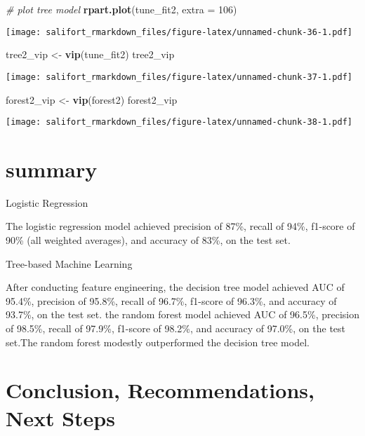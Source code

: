 \documentclass[
]{article}
\newenvironment{Shaded}{\begin{snugshade}}{\end{snugshade}}
\newcommand{\AttributeTok}[1]{\textcolor[rgb]{0.13,0.29,0.53}{#1}}
\newcommand{\CommentTok}[1]{\textcolor[rgb]{0.56,0.35,0.01}{\textit{#1}}}
\newcommand{\DecValTok}[1]{\textcolor[rgb]{0.00,0.00,0.81}{#1}}
\newcommand{\FunctionTok}[1]{\textcolor[rgb]{0.13,0.29,0.53}{\textbf{#1}}}
\newcommand{\NormalTok}[1]{#1}
\newcommand{\OtherTok}[1]{\textcolor[rgb]{0.56,0.35,0.01}{#1}}
\begin{document}
\begin{Shaded}
\begin{Highlighting}[]
\CommentTok{\# plot tree model}
\FunctionTok{rpart.plot}\NormalTok{(tune\_fit2, }\AttributeTok{extra =} \DecValTok{106}\NormalTok{)}
\end{Highlighting}
\end{Shaded}

\texttt{[image: salifort\_rmarkdown\_files/figure-latex/unnamed-chunk-36-1.pdf]}

\begin{Shaded}
\begin{Highlighting}[]
\NormalTok{tree2\_vip }\OtherTok{\textless{}{-}} \FunctionTok{vip}\NormalTok{(tune\_fit2)}
\NormalTok{tree2\_vip}
\end{Highlighting}
\end{Shaded}

\texttt{[image: salifort\_rmarkdown\_files/figure-latex/unnamed-chunk-37-1.pdf]}

\begin{Shaded}
\begin{Highlighting}[]
\NormalTok{forest2\_vip }\OtherTok{\textless{}{-}} \FunctionTok{vip}\NormalTok{(forest2)}
\NormalTok{forest2\_vip}
\end{Highlighting}
\end{Shaded}

\texttt{[image: salifort\_rmarkdown\_files/figure-latex/unnamed-chunk-38-1.pdf]}

\section{summary}\label{summary}

Logistic Regression

The logistic regression model achieved precision of 87\%, recall of
94\%, f1-score of 90\% (all weighted averages), and accuracy of 83\%, on
the test set.

Tree-based Machine Learning

After conducting feature engineering, the decision tree model achieved
AUC of 95.4\%, precision of 95.8\%, recall of 96.7\%, f1-score of
96.3\%, and accuracy of 93.7\%, on the test set. the random forest model
achieved AUC of 96.5\%, precision of 98.5\%, recall of 97.9\%, f1-score
of 98.2\%, and accuracy of 97.0\%, on the test set.The random forest
modestly outperformed the decision tree model.

\section{Conclusion, Recommendations, Next
Steps}\label{conclusion-recommendations-next-steps}
\end{document}
